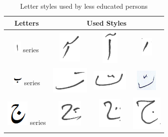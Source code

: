 \documentclass[a4paper,conference]{IEEEtran}
\begin{document}
\begin{table}[h]
\centering
\caption{Letter styles used by less educated persons}\label{tab6-led}
\begin{tabular}{@{}cccc@{}}
\hline
Letters	& \multicolumn{3}{c}{\textbf{Used Styles}} \\ \hline
\includegraphics[scale=0.50]{Alif.png} series & \includegraphics[scale=0.25]{alif_madd.PNG} & \includegraphics[scale=0.25]{ali_madd2.PNG}  & \includegraphics[scale=0.45]{alif_1.PNG}  \\ 
\hline
\includegraphics[scale=0.50]{Bay.png} series & \includegraphics[scale=0.20]{tai.PNG} & \includegraphics[scale=0.20]{tai2.PNG}  & \includegraphics[scale=0.20]{Tai3.png} \\
\hline
\includegraphics[scale=0.25]{jeeem} series & \includegraphics[scale=0.25]{chay} & \includegraphics[scale=0.20]{jeem}  & \includegraphics[scale=0.15]{jeeem2} \\

\end{tabular}
\end{table}
\end{document}
